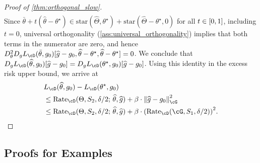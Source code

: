 \documentclass[11pt]{article} %
\newcommand{\pref}[1]{\cref{#1}}
\newcommand{\pfref}[1]{Proof of \pref{#1}}
\theoremstyle{theorem}  %
\theoremstyle{plain}
\DeclarePairedDelimiter{\brk}{[}{]}
\DeclarePairedDelimiter{\prn}{(}{)}
\DeclarePairedDelimiter{\nrm}{\|}{\|}
\newcommand{\wh}[1]{\widehat{#1}}
\newcommand{\midsem}{;\,}
\newcommand{\starhull}{\mathrm{star}}
\newcommand{\estone}{\wh{g}}
\newcommand{\esttwo}{\wh{\theta}}
\newcommand{\nuisance}{\cG}
\newcommand{\target}{\Theta}
\newcommand{\targetemp}{\wh{\Theta}}
\newcommand{\Rate}{\mathrm{Rate}_{\cD}}
\newcommand{\besttwo}{\theta^{\star}}
\newcommand{\gtone}{g_0}
\newcommand{\sampleone}{S_1}
\newcommand{\sampletwo}{S_2}
\begin{document}
\begin{proof}[\pfref{thm:orthogonal_slow}]
\begin{align*}
\end{align*}
Since $\bar{\theta} + t(\esttwo-\besttwo)\in\starhull(\targetemp,\besttwo) + \starhull(\targetemp-\besttwo,0)$ for all $t\in\brk*{0,1}$, including $t=0$, universal orthogonality (\pref{ass:universal_orthogonality}) implies that both terms in the numerator are zero, and hence $D_{\theta}^{2}D_{g}L_{\cD}(\bar{\theta},\gtone)[\estone-\gtone,\esttwo-\besttwo, \esttwo-\besttwo]=0$. We conclude that $D_{g}L_{\cD}(\esttwo,\gtone)[\estone-\gtone]
= D_{g}L_{\cD}(\besttwo,\gtone)[\estone-\gtone]$. Using this identity in the excess risk upper bound, we arrive at
\begin{align*}
&L_{\cD}(\esttwo,\gtone) - L_{\cD}(\besttwo, \gtone) \\
&\leq{}  \Rate(\target, \sampletwo, \delta/2\midsem\esttwo,\estone) + \beta{}\cdot{}\nrm*{\estone-\gtone}_{\nuisance}^{2}\\
&\leq{}  \Rate(\target, \sampletwo, \delta/2\midsem\esttwo,\estone) + \beta{}\cdot{}\prn*{\Rate(\nuisance,\sampleone,\delta/2)}^{2}.
\end{align*}
\end{proof}

\subsection{Proofs for Examples}
\label{app:example_proofs}
\end{document}
